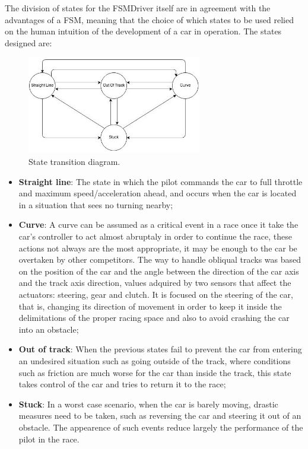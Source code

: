 	The division of states for the FSMDriver itself are in agreement with the advantages of a FSM, meaning that the choice of
	which states to be used relied on the human intuition of the development of a car in operation. The states designed are:

\begin{figure}[!t]
	\centering
	\includegraphics[width=3in]{StatesDiagram}
	\caption{State transition diagram.}
	\label{fig_sim}
\end{figure}

\begin{itemize}
	\item \textbf{Straight line}: The state in which the pilot commands the car to full throttle and maximum 
	speed/acceleration ahead, and occurs when the car is located in a situation that sees no turning nearby;
	
	\item \textbf{Curve}: A curve can be assumed as a critical event in a race once it take the car's controller
	to act almost abruptaly in order to continue the race, these actions not always are the most appropriate, it
	may be enough to the car be overtaken by other competitors. The way to handle obliqual tracks was based 
	on the position of the car and the angle between the direction of the car axis and the track axis direction, 
	values adquired by two sensors that affect the actuators: steering, gear and clutch. It is focused on the 
	steering of the car, that is, changing its direction of movement in order to keep it inside the delimitations 
	of the proper racing space and also to avoid crashing the car into an obstacle;
	
	\item \textbf{Out of track}: When the previous states fail to prevent the car from entering an undesired situation
	such as going outside of the track, where conditions such as friction are much worse for the car than inside the
	track, this state takes control of the car and tries to return it to the race;
	
	\item \textbf{Stuck}: In a worst case scenario, when the car is barely moving, drastic measures need to be taken,
	such as reversing the car and steering it out of an obstacle. The appearence of such events reduce largely the
	performance of the pilot in the race.
\end{itemize}

